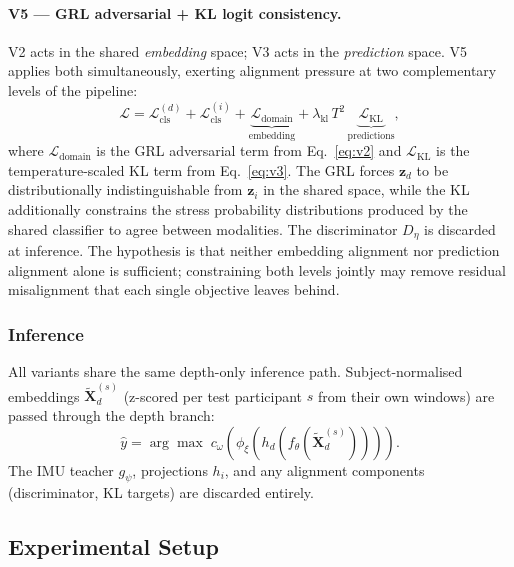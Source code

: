 \documentclass[sigconf,anonymous=false]{acmart}
\begin{document}
\paragraph{V5 --- GRL adversarial + KL logit consistency.}
V2 acts in the shared \emph{embedding} space; V3 acts in the
\emph{prediction} space.  V5 applies both simultaneously, exerting
alignment pressure at two complementary levels of the pipeline:
\begin{equation}
  \mathcal{L} = \mathcal{L}_\text{cls}^{(d)}
              + \mathcal{L}_\text{cls}^{(i)}
              + \underbrace{\mathcal{L}_\text{domain}}_{\text{embedding}}
              + \lambda_\text{kl}\,T^2\,
                \underbrace{\mathcal{L}_\text{KL}}_{\text{predictions}},
  \label{eq:v5}
\end{equation}
where $\mathcal{L}_\text{domain}$ is the GRL adversarial term from
Eq.~\eqref{eq:v2} and $\mathcal{L}_\text{KL}$ is the temperature-scaled
KL term from Eq.~\eqref{eq:v3}.
The GRL forces $\mathbf{z}_d$ to be distributionally indistinguishable
from $\mathbf{z}_i$ in the shared space, while the KL additionally
constrains the stress probability distributions produced by the shared
classifier to agree between modalities.
The discriminator $D_\eta$ is discarded at inference.
The hypothesis is that neither embedding alignment nor prediction
alignment alone is sufficient; constraining both levels jointly may
remove residual misalignment that each single objective leaves behind.

\subsubsection{Inference}

All variants share the same depth-only inference path.  Subject-normalised
embeddings $\tilde{\mathbf{X}}_d^{(s)}$ (z-scored per test participant $s$
from their own windows) are passed through the depth branch:
\begin{equation}
  \hat{y} = \arg\max\; c_\omega\!\left(
    \phi_\xi\!\left(h_d\!\left(f_\theta\!\left(
      \tilde{\mathbf{X}}_d^{(s)}\right)\right)\right)\right).
  \label{eq:infer}
\end{equation}
The IMU teacher $g_\psi$, projections $h_i$, and any alignment components
(discriminator, KL targets) are discarded entirely.

\subsection{Experimental Setup}
\label{sec:eval}
\end{document}
